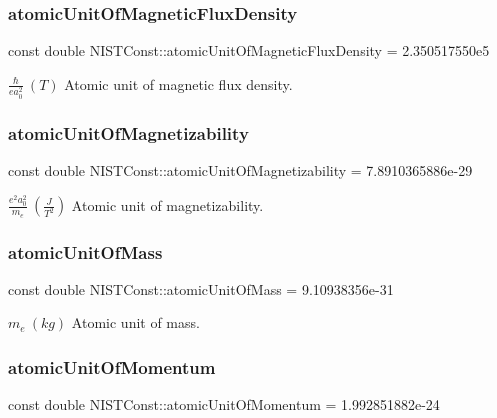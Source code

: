 \subsubsection{\texorpdfstring{atomic\+Unit\+Of\+Magnetic\+Flux\+Density}{atomicUnitOfMagneticFluxDensity}}
{\footnotesize\ttfamily const double N\+I\+S\+T\+Const\+::atomic\+Unit\+Of\+Magnetic\+Flux\+Density = 2.\+350517550e5}

$\frac{\hbar}{e a_0^2} \ (T)$ Atomic unit of magnetic flux density. \mbox{\label{group___atomic_unit_ga9c2b29b9a46e8dfd78837ef0c8a16bec}} 
\subsubsection{\texorpdfstring{atomic\+Unit\+Of\+Magnetizability}{atomicUnitOfMagnetizability}}
{\footnotesize\ttfamily const double N\+I\+S\+T\+Const\+::atomic\+Unit\+Of\+Magnetizability = 7.\+8910365886e-\/29}

$\frac{e^2a_0^2}{m_e} \ (\frac{J}{T^2})$ Atomic unit of magnetizability. \mbox{\label{group___atomic_unit_ga61a2da51489f7bb8965e9e4747db34a7}} 
\subsubsection{\texorpdfstring{atomic\+Unit\+Of\+Mass}{atomicUnitOfMass}}
{\footnotesize\ttfamily const double N\+I\+S\+T\+Const\+::atomic\+Unit\+Of\+Mass = 9.\+10938356e-\/31}

$m_e \ (kg)$ Atomic unit of mass. \mbox{\label{group___atomic_unit_gae70262618755d765a1de59f471b56040}} 
\subsubsection{\texorpdfstring{atomic\+Unit\+Of\+Momentum}{atomicUnitOfMomentum}}
{\footnotesize\ttfamily const double N\+I\+S\+T\+Const\+::atomic\+Unit\+Of\+Momentum = 1.\+992851882e-\/24}

